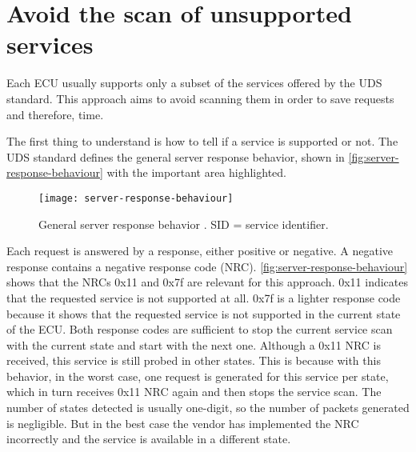 \section{Avoid the scan of unsupported services}
\label{subsec:unsupported-services-elaboration}

Each ECU usually supports only a subset of the services offered  by the UDS standard. This approach aims to avoid scanning them in order to save requests and therefore, time.

The first thing to understand is how to tell if a service is supported or not. The UDS standard defines the general server response behavior, shown in \autoref{fig:server-response-behaviour} with the important area highlighted.

\begin{figure}[h]
    \centering
    \texttt{[image: server-response-behaviour]}
    \caption{General server response behavior \cite{iso14229}. SID = service identifier.}
    \label{fig:server-response-behaviour}
\end{figure}

Each request is answered by a response, either positive or negative. A negative response contains a negative response code (NRC). \autoref{fig:server-response-behaviour} shows that the NRCs 0x11 and 0x7f are relevant for this approach. 0x11 indicates that the requested service is not supported at all. 0x7f is a lighter response code because it shows that the requested service is not supported in the current state of the ECU. Both response codes are sufficient to stop the current service scan with the current state and start with the next one. Although a 0x11 NRC is received, this service is still probed in other states. This is because with this behavior, in the worst case, one request is generated for this service per state, which in turn receives 0x11 NRC again and then stops the service scan. The number of states detected is usually one-digit, so the number of packets generated is negligible. But in the best case the vendor has implemented the NRC incorrectly and the service is available in a different state.
